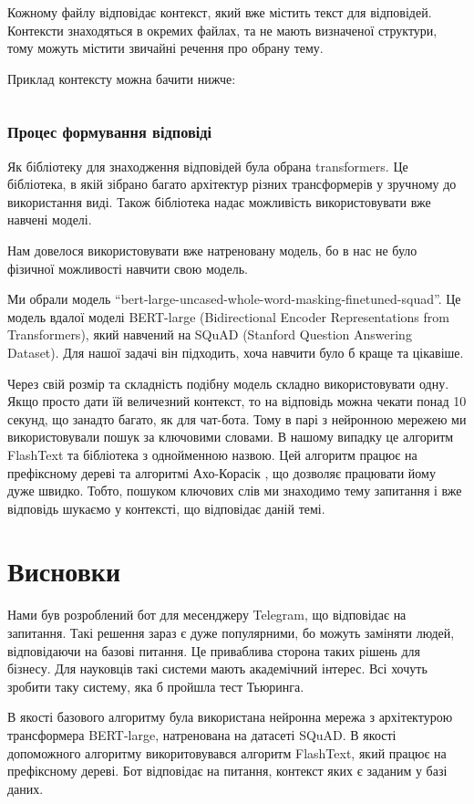 \documentclass[a4paper,14pt]{extreport}
\newcommand\chap[1]{%
  \chapter*{#1}%
  \addcontentsline{toc}{chapter}{\uppercase{#1}}}
\begin{document}
    Кожному файлу відповідає контекст, який вже містить текст для відповідей. Контексти знаходяться в окремих файлах, та не мають визначеної структури, тому можуть містити звичайні речення про обрану тему.

    Приклад контексту можна бачити нижче:

    \inputminted[breaklines,linenos=true]{text}{./ai.txt}

    \subsection{Процес формування відповіді}
    Як бібліотеку для знаходження відповідей була обрана transformers. Це бібліотека, в якій зібрано багато архітектур різних трансформерів у зручному до використання виді. Також бібліотека надає можливість використовувати вже навчені моделі.
    
    Нам довелося використовувати вже натреновану модель, бо в нас не було фізичної можливості навчити свою модель.

    Ми обрали модель ``bert-large-uncased-whole-word-masking-finetuned-squad''. Це модель вдалої моделі BERT-large (Bidirectional Encoder Representations from Transformers), який навчений на SQuAD (Stanford Question Answering Dataset). Для нашої задачі він підходить, хоча навчити було б краще та цікавіше.

    Через свій розмір та складність подібну модель складно використовувати одну. Якщо просто дати їй величезний контекст, то на відповідь можна чекати понад 10 секунд, що занадто багато, як для чат-бота. Тому в парі з нейронною мережею ми використовували пошук за ключовими словами. В нашому випадку це алгоритм FlashText \cite{flashtext:arxiv} та бібліотека \cite{flashtext:repo} з однойменною назвою. Цей алгоритм працює на префіксному дереві та алгоритмі Ахо-Корасік \cite{ahocorasik:wiki}, що дозволяє працювати йому дуже швидко. Тобто, пошуком ключових слів ми знаходимо тему запитання і вже відповідь шукаємо у контексті, що відповідає даній темі.

\chap{Висновки}
    Нами був розроблений бот для месенджеру Telegram, що відповідає на запитання. Такі решення зараз є дуже популярними, бо можуть заміняти людей, відповідаючи на базові питання. Це приваблива сторона таких рішень для бізнесу. Для науковців такі системи мають академічний інтерес. Всі хочуть зробити таку систему, яка б пройшла тест Тьюринга.
    
    В якості базового алгоритму була використана нейронна мережа з архітектурою трансформера BERT-large, натренована на датасеті SQuAD. В якості допоможного алгоритму викоритовувався алгоритм FlashText, який працює на префіксному дереві. Бот відповідає на питання, контекст яких є заданим у базі даних.
\end{document}
